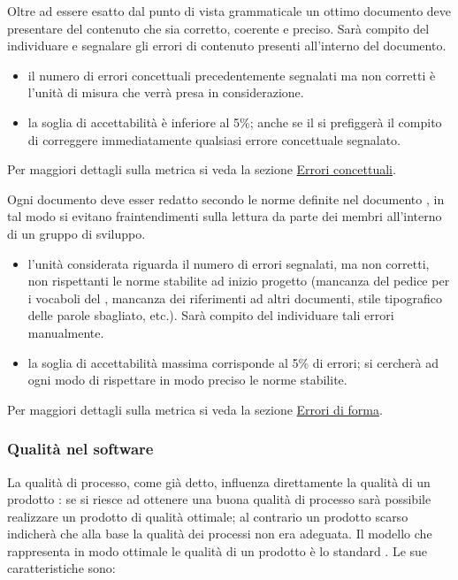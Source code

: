 \documentclass[a4paper, titlepage]{article}
\begin{document}
Oltre ad essere esatto dal punto di vista grammaticale un ottimo documento deve presentare del contenuto che sia corretto, coerente e preciso. Sarà compito del  individuare e segnalare gli errori di contenuto presenti all'interno del documento.
\begin{itemize}
\item {} il numero di errori concettuali precedentemente segnalati ma non corretti è l'unità di misura che verrà presa in considerazione.
\item {} la soglia di accettabilità è inferiore al 5\%; anche se il  si prefiggerà il compito di correggere immediatamente qualsiasi errore concettuale segnalato. 
\end{itemize}
Per maggiori dettagli sulla metrica si veda la sezione \hyperref[par:errcon]{Errori concettuali}.

Ogni documento deve esser redatto secondo le norme definite nel documento , in tal modo si evitano fraintendimenti sulla lettura da parte dei membri all'interno di un gruppo di sviluppo.
\begin{itemize}
\item {} l'unità considerata riguarda il numero di errori  segnalati, ma non corretti, non rispettanti le norme stabilite ad inizio progetto (mancanza del pedice per i vocaboli del , mancanza dei riferimenti ad altri documenti, stile tipografico delle parole sbagliato, etc.). Sarà compito del  individuare tali errori manualmente.
\item {} la soglia di accettabilità massima corrisponde al 5\% di errori; si cercherà ad ogni modo di rispettare in modo preciso le norme stabilite.
\end{itemize}
Per maggiori dettagli sulla metrica si veda la sezione \hyperref[par:errfor]{Errori di forma}.

\subsubsection{Qualità nel software}
La qualità di processo, come già detto, influenza direttamente la qualità di un prodotto : se si riesce ad ottenere una buona qualità di processo sarà possibile realizzare un prodotto di qualità ottimale; al contrario un prodotto scarso indicherà che alla base la qualità dei processi non era adeguata.
\newline Il modello che rappresenta in modo ottimale le qualità di un prodotto  è lo standard .
\newline Le sue caratteristiche sono:
\end{document}
